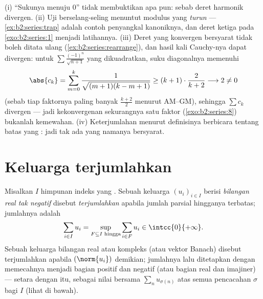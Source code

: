 \begin{remark}\label{rem:b2:series:pitfalls}
(i) ``Sukunya menuju $0$'' tidak membuktikan apa pun: sebab deret
harmonik divergen. (ii) Uji berselang-seling menuntut modulus yang
\emph{turun} --- \cref{ex:b2:series:trap} adalah contoh penyangkal
kanoniknya, dan deret ketiga pada \cref{exo:b2:series:1} menjadi
latihannya. (iii) Deret yang konvergen bersyarat tidak boleh
ditata ulang (\cref{ex:b2:series:rearrange}), dan hasil kali
Cauchy-nya dapat divergen: untuk $\sum\frac{(-1)^n}{\sqrt{n+1}}$
yang dikuadratkan, suku diagonalnya memenuhi
\[
\abs{c_k} = \sum_{m=0}^{k}
\frac{1}{\sqrt{(m+1)(k-m+1)}}
\geq (k+1)\cdot\frac{2}{k+2} \longrightarrow 2 \neq 0
\]
(sebab tiap faktornya paling banyak $\frac{k+2}2$ menurut AM--GM),
sehingga $\sum c_k$ divergen --- jadi kekonvergenan  sekurangnya
satu faktor (\cref{exo:b2:series:8}) bukanlah kemewahan. (iv)
Keterjumlahan menurut definisinya berbicara tentang batas yang
\emph{}: jadi tak ada yang namanya  bersyarat.
\end{remark}

\section{Keluarga terjumlahkan}

\begin{definition}\label{def:b2:series:summable}
Misalkan $I$ himpunan indeks yang . Sebuah keluarga $(u_i)_{i
\in I}$ berisi \emph{bilangan real tak negatif} disebut
\emph{terjumlahkan} apabila jumlah parsial
hingganya terbatas; jumlahnya adalah
\[
\sum_{i \in I} u_i = \sup_{F \subseteq I \text{ hingga}} \sum_{i
\in F} u_i \in \intcc{0}{+\infty} .
\]
Sebuah keluarga bilangan real atau kompleks (atau vektor Banach) disebut
terjumlahkan apabila $(\norm{u_i})$ demikian; jumlahnya lalu ditetapkan
dengan memecahnya menjadi bagian positif dan negatif (atau bagian real
dan imajiner) --- setara dengan itu, sebagai nilai bersama $\sum_{n}
u_{\sigma(n)}$ atas semua pencacahan $\sigma$ bagi $I$ (lihat di bawah).
\end{definition}

